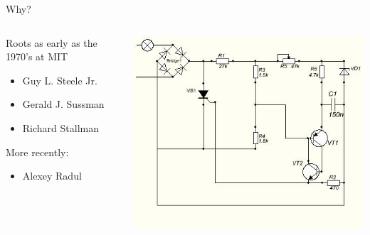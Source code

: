 \documentclass[usenames,dvipsnames,svgnames,table,aspectratio=1610,mathserif]{beamer}
\newcommand{\nl}{\vspace{\baselineskip}}
\begin{document}
\begin{frame}
\begin{columns}
\begin{column}{0.5\textwidth}
\begin{center}
      \nl

      Why?
    \end{center}
  \end{column}
\end{columns}

\end{frame}




\begin{frame}

\begin{columns}
\begin{column}{0.5\textwidth}
Roots as early as the 1970's at MIT
\begin{itemize}
  \item Guy L. Steele Jr. 
  \item Gerald J. Sussman
  \item Richard Stallman
\end{itemize}

\nl

More recently:
\begin{itemize}
  \item Alexey Radul
\end{itemize}
\end{column}
\begin{column}{0.5\textwidth}
\includegraphics[scale=0.6]{circuit.jpg}
\end{column}
\end{columns}

\end{frame}
\end{document}
